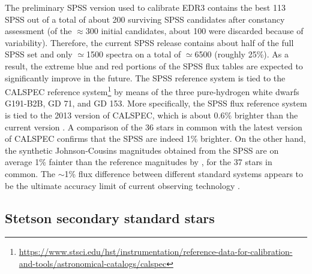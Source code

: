 \documentclass{aa}
\begin{document}
\begin{appendix}
The preliminary SPSS version used to calibrate EDR3 contains the best 113 SPSS out of a total of about 200 surviving SPSS candidates after constancy assessment (of the $\approx300$ initial candidates, about 100 were discarded because of variability). Therefore, the current SPSS release contains about half of the full SPSS set and only $\simeq$1500 spectra on a total of $\simeq$6500 (roughly 25\%). As a result, the extreme blue and red portions of the SPSS flux tables are expected to significantly improve in the future. The SPSS reference system is tied to the CALSPEC reference system\footnote{\url{https://www.stsci.edu/hst/instrumentation/reference-data-for-calibration-and-tools/astronomical-catalogs/calspec}} \citep{Bohlin2019} by means of the three pure-hydrogen white dwarfs G191-B2B, GD 71, and GD 153. More specifically, the SPSS flux reference system is tied to the 2013 version of CALSPEC, which is about 0.6\% brighter than the current version \citep{bohlin14}. A comparison of the 36 stars in common with the latest version of CALSPEC confirms that the SPSS are indeed 1\% brighter. On the other hand, the synthetic Johnson-Cousins magnitudes obtained from the SPSS are on average 1\% fainter than the reference magnitudes by \citep{landolt92}, for the 37 stars in common. The $\sim$1\% flux difference between different standard systems appears to be the ultimate accuracy limit of current observing technology \citep[see the discussion by][]{clem13}.

\subsection{Stetson secondary standard stars}\label{app:stetson}


\end{appendix}
\end{document}
